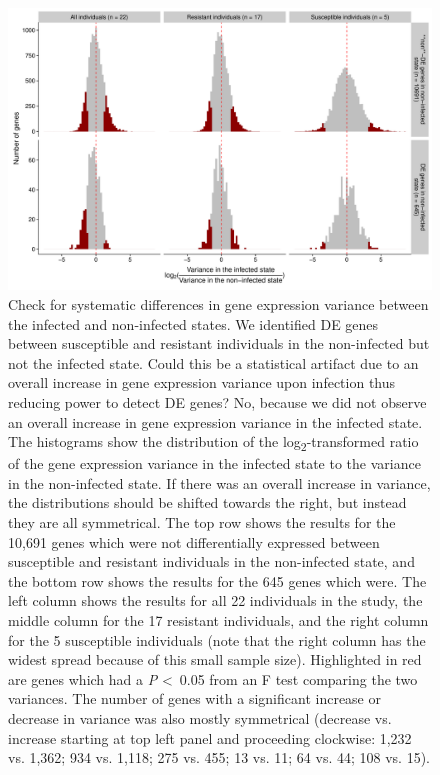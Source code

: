 \documentclass[fleqn,10pt]{wlscirep}
\begin{document}
\begin{figure}[ht]
\centering
\includegraphics[width=\linewidth]{../figure/variance.pdf}
\caption{
Check for systematic differences in gene expression variance between
the infected and non-infected states. We identified DE genes between
susceptible and resistant individuals in the non-infected but not the
infected state. Could this be a statistical artifact due to an overall
increase in gene expression variance upon infection thus reducing
power to detect DE genes? No, because we did not observe an overall
increase in gene expression variance in the infected state. The
histograms show the distribution of the
log\textsubscript{2}-transformed ratio of the gene expression variance
in the infected state to the variance in the non-infected state. If
there was an overall increase in variance, the distributions should be
shifted towards the right, but instead they are all symmetrical. The
top row shows the results for the 10,691 genes which were not
differentially expressed between susceptible and resistant individuals
in the non-infected state, and the bottom row shows the results for
the 645 genes which were. The left column shows the results for all 22
individuals in the study, the middle column for the 17 resistant
individuals, and the right column for the 5 susceptible individuals
(note that the right column has the widest spread because of this
small sample size). Highlighted in red are genes which had a \emph{P}
\textless \, 0.05 from an F test comparing the two variances. The
number of genes with a significant increase or decrease in variance
was also mostly symmetrical (decrease vs. increase starting at top
left panel and proceeding clockwise: 1,232 vs. 1,362; 934 vs. 1,118;
275 vs. 455; 13 vs. 11; 64 vs. 44; 108 vs. 15).
}
\label{fig:variance}
\end{figure}
\end{document}
